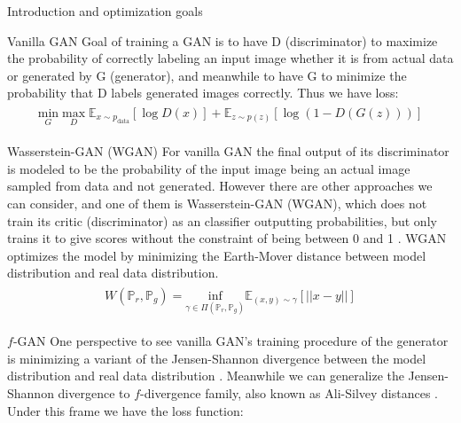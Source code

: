 \documentclass[final]{beamer}
\newlength{\colwidth}
\begin{document}
\begin{frame}[t]
\begin{columns}[t]
\begin{column}{\colwidth}
\begin{block}{Introduction and optimization goals}
\begin{alertblock}{Vanilla GAN}
Goal of training a GAN is to have D (discriminator) to maximize the probability of correctly labeling an input image whether it is from actual data or generated by G (generator), and meanwhile to have G to minimize the probability that D labels generated images correctly. Thus we have loss:
\begin{equation} 
\begin{split}
\begin{aligned}
\underset{G}{\text{min}}\; \underset{D}{\text{max}}\; \mathbb{E}_{x \sim p_\text{data}}\left[\log D(x)\right] + \mathbb{E}_{z \sim p(z)}\left[\log \left(1-D(G(z))\right)\right]
\end{aligned}
\end{split}
\label{loss_gan}
\end{equation}
\end{alertblock}
\begin{alertblock}{Wasserstein-GAN (WGAN)}
For vanilla GAN the final output of its discriminator is modeled to be the probability of the input image being an actual image sampled from data and not generated. However there are other approaches we can consider, and one of them is Wasserstein-GAN (WGAN), which does not train its critic (discriminator) as an classifier outputting probabilities, but only trains it to give scores without the constraint of being between 0 and 1 \cite{arjovsky2017wasserstein}. WGAN optimizes the model by minimizing the Earth-Mover distance between model distribution and real data distribution.
\begin{equation} 
\begin{split}
\begin{aligned}
W(\mathbb{P}_r, \mathbb{P}_g) = \underset{\gamma \in \Pi(\mathbb{P}_r, \mathbb{P}_g)}{\text{inf}} \mathbb{E}_{(x, y) \sim\gamma}[||x - y||]
\end{aligned}
\end{split}
\label{em_i}
\end{equation}
\end{alertblock}
\begin{alertblock}{$f$-GAN}
One perspective to see vanilla GAN's training procedure of the generator is minimizing a variant of the Jensen-Shannon divergence between the model distribution and real data distribution \cite{goodfellow2014generative}. Meanwhile we can generalize the Jensen-Shannon divergence to $f$-divergence family, also known as Ali-Silvey distances \cite{nowozin2016fgan}. Under this frame we have the loss function:

\end{alertblock}
\end{block}
\end{column}
\end{columns}
\end{frame}
\end{document}
